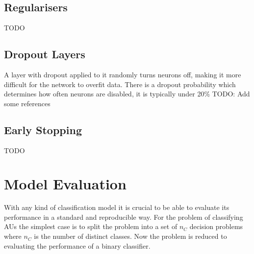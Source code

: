     \subsection{Regularisers}
      {\color{red} TODO}
    \subsection{Dropout Layers} \label{sec:dropout}
      A layer with dropout applied to it randomly turns neurons off, making it more
      difficult for the network to overfit data. There is a dropout probability
      which determines how often neurons are disabled, it is typically under 20\%
      {\color{red} TODO: Add some references}
    \subsection{Early Stopping}
      {\color{red} TODO}
  \section{Model Evaluation} \label{sec:eval}
    With any kind of classification model it is crucial to be able to evaluate its
    performance in a standard and reproducible way. For the problem of classifying
    AUs the simplest case is to split the problem into a set of $n_C$ decision problems
    where $n_C$ is the number of distinct classes. Now the problem is reduced to
    evaluating the performance of a binary classifier.

